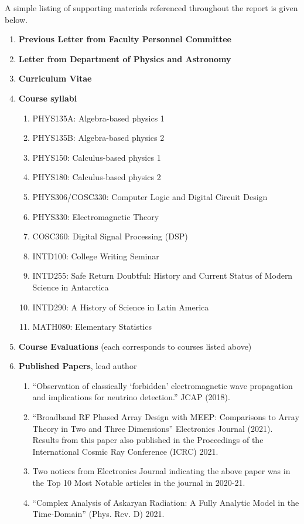 \documentclass[../../main.tex]{subfiles}
\begin{document}
A simple listing of supporting materials referenced throughout the report is given below.
\begin{enumerate}
\item \textbf{Previous Letter from Faculty Personnel Committee}
\item \textbf{Letter from Department of Physics and Astronomy}
\item \textbf{Curriculum Vitae}
\item \textbf{Course syllabi}
\begin{enumerate}
\item PHYS135A: Algebra-based physics 1
\item PHYS135B: Algebra-based physics 2
\item PHYS150: Calculus-based physics 1
\item PHYS180: Calculus-based physics 2
\item PHYS306/COSC330: Computer Logic and Digital Circuit Design
\item PHYS330: Electromagnetic Theory
\item COSC360: Digital Signal Processing (DSP)
\item INTD100: College Writing Seminar
\item INTD255: Safe Return Doubtful: History and Current Status of Modern Science in Antarctica
\item INTD290: A History of Science in Latin America
\item MATH080: Elementary Statistics
\end{enumerate}
\item \textbf{Course Evaluations} (each corresponds to courses listed above)
\item \textbf{Published Papers}, lead author
\begin{enumerate}
\item ``Observation of classically `forbidden' electromagnetic wave propagation and implications for neutrino detection.'' JCAP (2018).
\item ``Broadband RF Phased Array Design with MEEP: Comparisons to Array Theory in Two and Three Dimensions'' Electronics Journal (2021).  Results from this paper also published in the Proceedings of the International Cosmic Ray Conference (ICRC) 2021.
\item Two notices from Electronics Journal indicating the above paper was in the Top 10 Most Notable articles in the journal in 2020-21.
\item ``Complex Analysis of Askaryan Radiation: A Fully Analytic Model in the Time-Domain'' (Phys. Rev. D) 2021.

\end{enumerate}
\end{enumerate}
\end{document}
